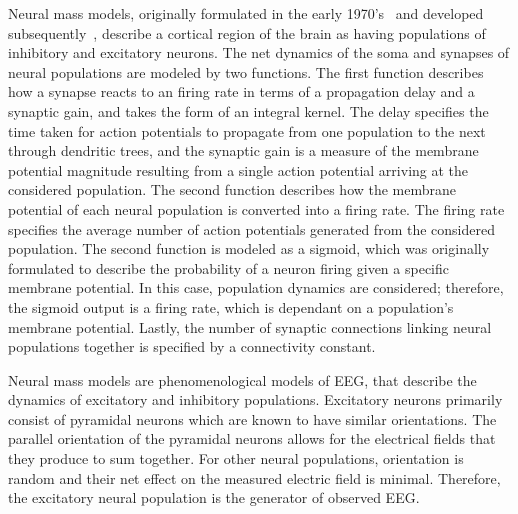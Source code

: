 Neural mass models, originally formulated in the early 1970's~\citep{wilson1973mathematical,lopes1974model,freeman1963electrical} and developed subsequently~\citep{jansen1995electroencephalogram}, describe a cortical region of the brain as having populations of inhibitory and excitatory neurons. The net dynamics of the soma and synapses of neural populations are modeled by two functions. The first function describes how a synapse reacts to an firing rate in terms of a propagation delay and a synaptic gain, and takes the form of an integral kernel. The delay specifies the time taken for action potentials to propagate from one population to the next through dendritic trees, and the synaptic gain is a measure of the membrane potential magnitude resulting from a single action potential arriving at the considered population. The second function describes how the membrane potential of each neural population is converted into a firing rate. The firing rate specifies the average number of action potentials generated from the considered population. The second function is modeled as a sigmoid, which was originally formulated to describe the probability of a neuron firing given a specific membrane potential. In this case, population dynamics are considered; therefore, the sigmoid output is a firing rate, which is dependant on a population's membrane potential. Lastly, the number of synaptic connections linking neural populations together is specified by a connectivity constant. 

Neural mass models are phenomenological models of EEG, that describe the dynamics of excitatory and inhibitory populations. Excitatory neurons primarily consist of pyramidal neurons  which are known to have similar orientations. The parallel orientation of the pyramidal neurons allows for the electrical fields that they produce to sum together. For other neural populations, orientation is random and their net effect on the measured electric field is minimal. Therefore, the excitatory neural population is the generator of observed EEG. 

